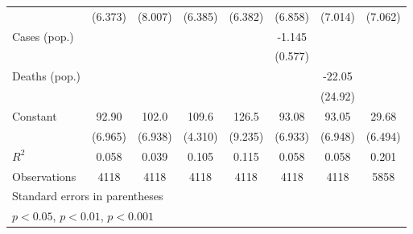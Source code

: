 \documentclass{article}
\begin{document}
{\begin{longtable}{l*{7}{c}}
                &  (6.373)         &  (8.007)         &  (6.385)         &  (6.382)         &  (6.858)         &  (7.014)         &  (7.062)         \\
Cases (pop.)    &                  &                  &                  &                  &   -1.145         &                  &                  \\
                &                  &                  &                  &                  &  (0.577)         &                  &                  \\
Deaths (pop.)   &                  &                  &                  &                  &                  &   -22.05         &                  \\
                &                  &                  &                  &                  &                  &  (24.92)         &                  \\
Constant        &    92.90\sym{***}&    102.0\sym{***}&    109.6\sym{***}&    126.5\sym{***}&    93.08\sym{***}&    93.05\sym{***}&    29.68\sym{***}\\
                &  (6.965)         &  (6.938)         &  (4.310)         &  (9.235)         &  (6.933)         &  (6.948)         &  (6.494)         \\
\hline
\(R^{2}\)       &    0.058         &    0.039         &    0.105         &    0.115         &    0.058         &    0.058         &    0.201         \\
Observations    &     4118         &     4118         &     4118         &     4118         &     4118         &     4118         &     5858         \\
\hline\hline
\multicolumn{8}{l}{\footnotesize Standard errors in parentheses}\\
\multicolumn{8}{l}{\footnotesize \sym{*} \(p<0.05\), \sym{**} \(p<0.01\), \sym{***} \(p<0.001\)}\\
\end{longtable}
}
\end{document}
